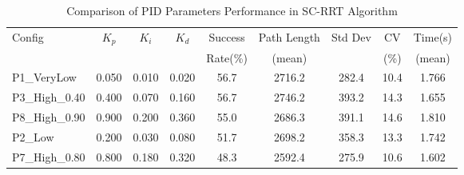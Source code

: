 
\begin{table}[htbp]
\centering
\caption{Comparison of PID Parameters Performance in SC-RRT Algorithm}
\label{tab:pid_comparison}
\begin{tabular}{lcccccccc}
\hline
Config & $K_p$ & $K_i$ & $K_d$ & Success & Path Length & Std Dev & CV & Time(s) \\
 & & & & Rate(\%) & (mean) & & (\%) & (mean) \\
\hline
P1\_VeryLow & 0.050 & 0.010 & 0.020 & 56.7 & 2716.2 & 282.4 & 10.4 & 1.766 \\
P3\_High\_0.40 & 0.400 & 0.070 & 0.160 & 56.7 & 2746.2 & 393.2 & 14.3 & 1.655 \\
P8\_High\_0.90 & 0.900 & 0.200 & 0.360 & 55.0 & 2686.3 & 391.1 & 14.6 & 1.810 \\
P2\_Low & 0.200 & 0.030 & 0.080 & 51.7 & 2698.2 & 358.3 & 13.3 & 1.742 \\
P7\_High\_0.80 & 0.800 & 0.180 & 0.320 & 48.3 & 2592.4 & 275.9 & 10.6 & 1.602 \\
\hline
\end{tabular}
\end{table}

